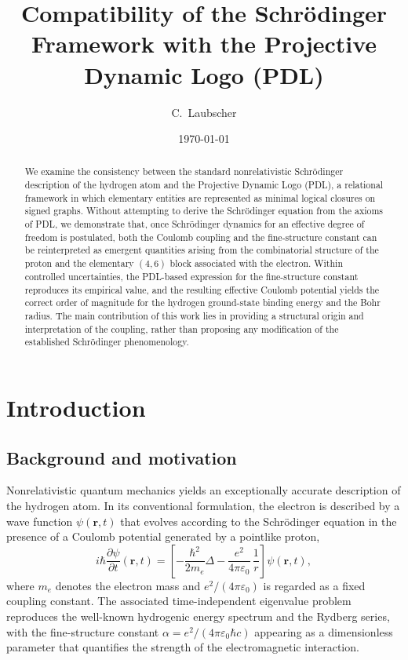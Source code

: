 \documentclass[12pt,a4paper]{article}
\title{Compatibility of the Schr\"odinger Framework with the Projective Dynamic Logo (PDL)}
\author{C.~Laubscher}
\date{\today}
\begin{document}
\maketitle

\begin{abstract}
We examine the consistency between the standard nonrelativistic Schr\"odinger description of the hydrogen atom and the Projective Dynamic Logo (PDL), a relational framework in which elementary entities are represented as minimal logical closures on signed graphs. Without attempting to derive the Schr\"odinger equation from the axioms of PDL, we demonstrate that, once Schr\"odinger dynamics for an effective degree of freedom is postulated, both the Coulomb coupling and the fine-structure constant can be reinterpreted as emergent quantities arising from the combinatorial structure of the proton and the elementary $(4,6)$ block associated with the electron. Within controlled uncertainties, the PDL-based expression for the fine-structure constant reproduces its empirical value, and the resulting effective Coulomb potential yields the correct order of magnitude for the hydrogen ground-state binding energy and the Bohr radius. The main contribution of this work lies in providing a structural origin and interpretation of the coupling, rather than proposing any modification of the established Schr\"odinger phenomenology.
\end{abstract}

\section{Introduction}

\subsection{Background and motivation}

Nonrelativistic quantum mechanics yields an exceptionally accurate description of the hydrogen atom. In its conventional formulation, the electron is described by a wave function \(\psi(\mathbf{r},t)\) that evolves according to the Schrödinger equation in the presence of a Coulomb potential generated by a pointlike proton,
\[
  i\hbar \frac{\partial \psi}{\partial t}(\mathbf{r},t)
  =
  \left[
    -\frac{\hbar^2}{2m_e}\Delta
    - \frac{e^2}{4\pi\varepsilon_0}\,\frac{1}{r}
  \right]
  \psi(\mathbf{r},t),
\]
where \(m_e\) denotes the electron mass and \(e^2/(4\pi\varepsilon_0)\) is regarded as a fixed coupling constant. The associated time-independent eigenvalue problem reproduces the well-known hydrogenic energy spectrum and the Rydberg series, with the fine-structure constant \(\alpha = e^2/(4\pi\varepsilon_0 \hbar c)\) appearing as a dimensionless parameter that quantifies the strength of the electromagnetic interaction.
\end{document}
